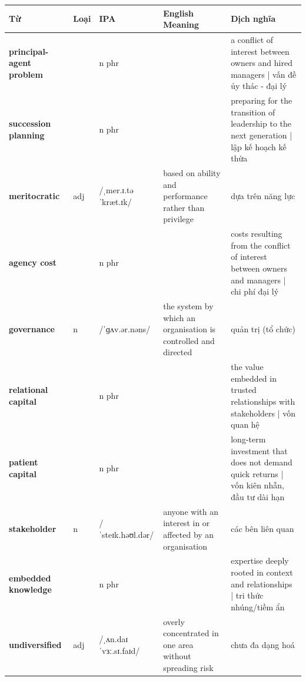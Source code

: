 \vspace{0.8em}
\begin{center}
\renewcommand{\arraystretch}{1.65}
\begin{tabularx}{\textwidth}{|V{0.22\textwidth}|C{0.07\textwidth}|I{0.20\textwidth}|Y|V{0.18\textwidth}|}
\hline
{}
\textbf{Từ} & \textbf{Loại} & \textbf{IPA} & \textbf{English Meaning} & \textbf{Dịch nghĩa} \\
\hline
\textbf{principal-agent problem} & & n phr & & a conflict of interest between owners and hired managers | vấn đề ủy thác - đại lý \\ \hline
\textbf{succession planning} & & n phr & & preparing for the transition of leadership to the next generation | lập kế hoạch kế thừa \\ \hline
\textbf{meritocratic} & adj & /ˌmer.ɪ.təˈkræt.ɪk/ & based on ability and performance rather than privilege & dựa trên năng lực \\ \hline
\textbf{agency cost} & & n phr & & costs resulting from the conflict of interest between owners and managers | chi phí đại lý \\ \hline
\textbf{governance} & n & /ˈɡʌv.ər.nəns/ & the system by which an organisation is controlled and directed & quản trị (tổ chức) \\ \hline
\textbf{relational capital} & & n phr & & the value embedded in trusted relationships with stakeholders | vốn quan hệ \\ \hline
\textbf{patient capital} & & n phr & & long-term investment that does not demand quick returns | vốn kiên nhẫn, đầu tư dài hạn \\ \hline
\textbf{stakeholder} & n & /ˈsteɪk.həʊl.dər/ & anyone with an interest in or affected by an organisation & các bên liên quan \\ \hline
\textbf{embedded knowledge} & & n phr & & expertise deeply rooted in context and relationships | tri thức nhúng/tiềm ẩn \\ \hline
\textbf{undiversified} & adj & /ˌʌn.daɪˈvɜː.sɪ.faɪd/ & overly concentrated in one area without spreading risk & chưa đa dạng hoá \\ \hline
\end{tabularx}
\end{center}

\newpage

